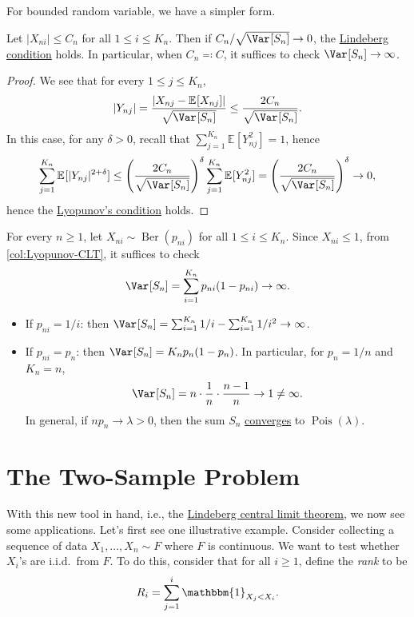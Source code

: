 For bounded random variable, we have a simpler form.

\begin{corollary}\label{col:Lyopunov-CLT}
	Let \(\vert X_{ni} \vert \leq C_n\) for all \(1 \leq i \leq K_n\). Then if \(C_n / \sqrt{\Var_{}[S_n] } \to 0\), the \hyperref[def:Lindeberg-condition]{Lindeberg condition} holds. In particular, when \(C_n \eqqcolon C\), it suffices to check \(\Var_{}[S_n] \to \infty \).
\end{corollary}
\begin{proof}
	We see that for every \(1 \leq j \leq K_n\),
	\[
		\vert Y_{nj} \vert
		= \frac{\vert X_{nj} - \mathbb{E}_{}[X_{nj}] \vert }{\sqrt{\Var_{}[S_n] } }
		\leq \frac{2 C_n}{\sqrt{\Var_{}[S_n] } }.
	\]
	In this case, for any \(\delta > 0\), recall that \(\sum_{j=1}^{K_n} \mathbb{E}_{}[Y_{nj}^2] = 1\), hence
	\[
		\sum_{j=1}^{K_n} \mathbb{E}_{}[\vert Y_{nj} \vert ^{2 + \delta }]
		\leq \left( \frac{2C_n}{\sqrt{\Var_{}[S_n] } } \right) ^\delta \sum_{j=1}^{K_n} \mathbb{E}_{}[Y_{nj}^2]
		= \left( \frac{2C_n}{\sqrt{\Var_{}[S_n] } } \right) ^\delta
		\to 0,
	\]
	hence the \hyperref[thm:Lyopunov-CLT]{Lyopunov's condition} holds.
\end{proof}

\begin{eg}\label{eg:Lyopunov-CLT}
	For every \(n \geq 1\), let \(X_{ni} \sim \operatorname{Ber}(p_{ni}) \) for all \(1 \leq i \leq K_n\). Since \(X_{ni} \leq 1\), from \autoref{col:Lyopunov-CLT}, it suffices to check
	\[
		\Var_{}[S_n]
		= \sum_{i=1}^{K_n} p_{ni} (1 - p_{ni}) \to \infty .
	\]
	\begin{itemize}
		\item If \(p_{ni} = 1 / i\): then \(\Var_{}[S_n] = \sum_{i=1}^{K_n} 1 / i - \sum_{i=1}^{K_n} 1 / i^2 \to \infty \).
		\item If \(p_{ni} = p_n\): then \(\Var_{}[S_n] = K_n p_n (1 - p_n)\). In particular, for \(p_n = 1 / n\) and \(K_n = n\),
		      \[
			      \Var_{}[S_n]
			      = n \cdot \frac{1}{n} \cdot \frac{n-1}{n}
			      \to 1
			      \neq \infty .
		      \]
		      In general, if \(n p_n \to \lambda > 0\), then the sum \(S_n\) \hyperref[def:converge-in-distribution]{converges} to \(\operatorname{Pois}(\lambda ) \).
	\end{itemize}
\end{eg}

\section{The Two-Sample Problem}
With this new tool in hand, i.e., the \hyperref[thm:Lindeberg-CLT]{Lindeberg central limit theorem}, we now see some applications. Let's first see one illustrative example. Consider collecting a sequence of data \(X_1, \dots , X_n \sim F\) where \(F\) is continuous. We want to test whether \(X_i\)'s are i.i.d.\ from \(F\). To do this, consider that for all \(i \geq 1\), define the \emph{rank} to be
\[
	R_i = \sum_{j=1}^{i} \mathbbm{1}_{X_j < X_i}.
\]

